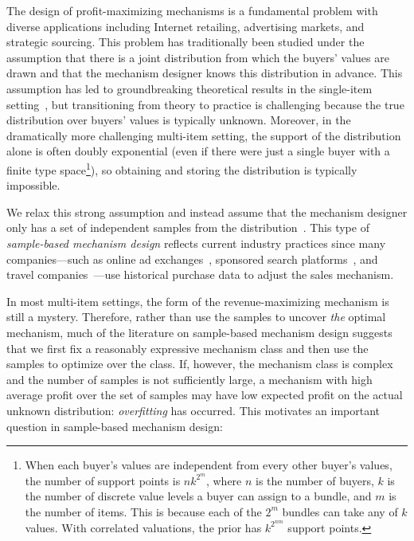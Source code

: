 The design of profit-maximizing mechanisms is a fundamental problem with diverse applications including Internet retailing, advertising markets, and strategic sourcing.
This problem has traditionally been studied under the assumption that there is a joint distribution from which the buyers' values are drawn and that the mechanism designer knows this distribution in advance. This assumption has led to groundbreaking theoretical results in the single-item setting~\citep{Myerson81:Optimal}, but transitioning from theory to practice is challenging because the true distribution over buyers' values is typically unknown. Moreover, in the dramatically more challenging multi-item setting, the support of the distribution alone is
often doubly exponential (even if there were just a single buyer with a finite type space\footnote{When each buyer's values are independent from every other buyer's values, the number of support points is $nk^{2^m}$, where $n$ is the number of buyers, $k$ is the number of discrete value levels a buyer can assign to a bundle, and $m$ is the number of items.  This is because each of the $2^m$ bundles can take any of $k$ values.  With correlated valuations, the prior has $k^{2^{nm}}$ support points.}), so obtaining and storing the distribution is typically impossible.

We relax this strong assumption and instead assume that the mechanism designer only has a set of independent samples from the distribution~\citep{Likhodedov04:Boosting,Likhodedov05:Approximating,Sandholm15:Automated}. 
This type of \emph{sample-based mechanism design} reflects current industry practices since many companies---such as online ad exchanges~\citep{He14:Practical, Medina17:Revenue}, sponsored search platforms~\citep{Edelman07:Internet, Tang17:Reinforcement}, and travel companies~\citep{Yee15:Aerosolve}---use historical purchase data to adjust the sales mechanism.

In most multi-item settings, the form of the revenue-maximizing mechanism is still a mystery. Therefore, rather than use the samples to uncover \emph{the} optimal mechanism, much of the literature on sample-based mechanism design suggests that we first fix a reasonably expressive mechanism class and then use the samples to optimize over the class. If, however, the mechanism class is complex and the number of samples is not sufficiently large, a mechanism with high average profit over the set of samples may have low expected profit on the actual unknown distribution: \emph{overfitting} has occurred. This motivates an important question in sample-based mechanism design:

